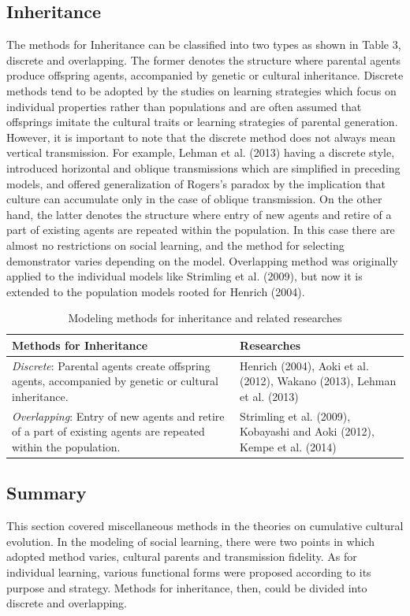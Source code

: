 \documentclass[a4paper, dvipdfmx]{article}
\begin{document}
\subsection*{Inheritance}
The methods for Inheritance can be classified into two types as shown in Table 3, discrete and overlapping. The former denotes the structure where parental agents produce offspring agents, accompanied by genetic or cultural inheritance. Discrete methods tend to be adopted by the studies on learning strategies which focus on individual properties rather than populations and are often assumed that offsprings imitate the cultural traits or learning strategies of parental generation. However, it is important to note that the discrete method does not always mean vertical transmission. For example, Lehman et al. (2013) having a discrete style, introduced horizontal and oblique transmissions which are simplified in preceding models, and offered generalization of Rogers's paradox by the implication that culture can accumulate only in the case of oblique transmission. On the other hand, the latter denotes the structure where entry of new agents and retire of a part of existing agents are repeated within the population. In this case there are almost no restrictions on social learning, and the method for selecting demonstrator varies depending on the model. Overlapping method was originally applied to the individual models like Strimling et al. (2009), but now it is extended to the population models rooted for Henrich (2004).

\begin{table}[hbt]
    \centering
    \caption{Modeling methods for inheritance and related researches}
    \begin{tabularx}{.9\linewidth}{XX}
        \toprule
        Methods for Inheritance & Researches \\
        \midrule
        {\it Discrete}: Parental agents create offspring agents, accompanied by genetic or cultural inheritance. & Henrich (2004), Aoki et al. (2012), Wakano (2013), Lehman et al. (2013) \\ \midrule
        {\it Overlapping}: Entry of new agents and retire of a part of existing agents are repeated within the population. & Strimling et al. (2009), Kobayashi and Aoki (2012), Kempe et al. (2014) \\ \bottomrule
    \end{tabularx}
\end{table}

\subsection*{Summary}
This section covered miscellaneous methods in the theories on cumulative cultural evolution. In the modeling of social learning, there were two points in which adopted method varies, cultural parents and transmission fidelity. As for individual learning, various functional forms were proposed according to its purpose and strategy. Methods for inheritance, then, could be divided into discrete and overlapping.
\end{document}
